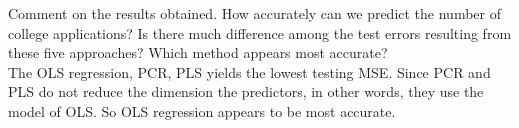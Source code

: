 \documentclass[12pt,fleqn]{article}\usepackage[]{graphicx}\usepackage[]{color}
\theoremstyle{definition}
\begin{document}
\begin{enumerate}[1.]
		Comment on the results obtained. How accurately can we predict the number of college applications? Is there much difference among the test errors resulting from these five approaches? Which method appears most accurate?\\[5pt]
		The OLS regression, PCR, PLS yields the lowest testing MSE. Since PCR and PLS do not reduce the dimension the predictors, in other words, they use the model of OLS. So OLS regression appears to be most accurate.
	\end{enumerate}
\end{document}
